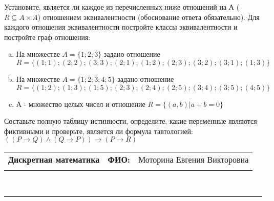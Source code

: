 \documentclass[10pt]{exam}
\newcommand{\class}{Дискретная математика}
\newcommand{\examdate}{}
\begin{document}
\begin{questions}
\question
Установите, является ли каждое из перечисленных ниже отношений на А ($R \subseteq A \times A$) отношением эквивалентности (обоснование ответа обязательно). Для каждого отношения эквивалентности постройте классы 
эквивалентности и постройте граф отношения:
\begin{enumerate} [a)]\setcounter{enumi}{0}
\item На множестве $A = \{1; 2; 3\}$ задано отношение $R = \{(1; 1); (2; 2); (3; 3); (2; 1); (1; 2); (2; 3); (3; 2); (3; 1); (1; 3)\}$
\item На множестве $A = \{1; 2; 3; 4; 5\}$ задано отношение $R = \{(1; 2); (1; 3); (1; 5); (2; 3); (2; 4); (2; 5); (3; 4); (3; 5); (4; 5)\}$
\item А - множество целых чисел и отношение $R = \{(a,b)|a + b = 0\}$
\end{enumerate}\question Составьте полную таблицу истинности, определите, какие переменные являются фиктивными и проверьте, является ли формула тавтологией:
$(( P \rightarrow Q) \land (Q \rightarrow P)) \rightarrow (P \rightarrow R)$

\end{questions}
\newpage
\begin{flushright}
\begin{tabular}{p{2.8in} r l}
\textbf{\class} & \textbf{ФИО:} &Моторина Евгения Викторовна
\\

\textbf{\examdate} &&\\
\end{tabular}\\
\end{flushright}
\rule[1ex]{\textwidth}{.1pt}
\end{document}
